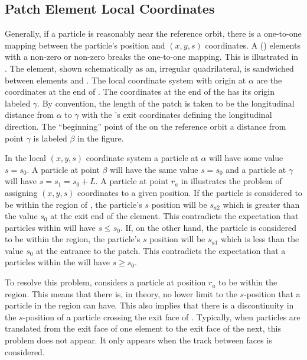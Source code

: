 \subsection{Patch Element Local Coordinates}
\label{s:patch.prob}

Generally, if a particle is reasonably near the reference orbit, there
is a one-to-one mapping between the particle's position and $(x, y,
s)$ coordinates. A  () elements with a
non-zero  or non-zero  breaks the one-to-one
mapping. This is illustrated in .  The 
element, shown schematically as an, irregular quadrilateral, is
sandwiched between elements  and . The local
coordinate system with origin at $\alpha$ are the coordinates at the
end of . The coordinates at the end of the  has
its origin labeled $\gamma$. By convention, the length of the patch
 is taken to be the longitudinal distance from $\alpha$ to
$\gamma$ with the 's exit coordinates defining the
longitudinal direction. The ``beginning'' point of the  on
the reference orbit a distance  from point $\gamma$ is labeled
$\beta$ in the figure.

In the local $(x, y, s)$ coordinate system a particle at $\alpha$ will
have some value $s = s_0$. A particle at point $\beta$ will have the
same value $s = s_0$ and a particle at $\gamma$ will have $s = s_1 =
s_0 + L$. A particle at point $r_a$ in  illustrates
the problem of assigning $(x, y, s)$ coordinates to a given
position. If the particle is considered to be within the region of
, the particle's $s$ position will be $s_{a2}$ which is
greater than the value $s_0$ at the exit end of the element. This
contradicts the expectation that particles within  will have
$s \le s_0$.  If, on the other hand, the particle is considered to be
within the  region, the particle's $s$ position will be
$s_{a1}$ which is less than the value $s_0$ at the entrance to the
patch. This contradicts the expectation that a particles within the
 will have $s \ge s_0$.

To resolve this problem, \bmad considers a particle at position $r_a$
to be within the  region. This means that there is, in
theory, no lower limit to the $s$-position that a particle in the
 region can have. This also implies that there is a
discontinuity in the $s$-position of a particle crossing the exit face
of . Typically, when particles are translated from the exit
face of one element to the exit face of the next, this 
problem does not appear. It only appears when the track between faces
is considered.

